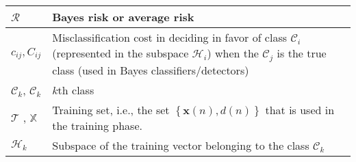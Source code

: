 \begin{xltabular}{\textwidth}{XX}
	\(\mathscr{R}\)                                                                                                                                                                & Bayes risk or average risk \cite{haykinNeuralNetworksLearning2009}                                                                                                                                                                                                                                                                     \\ \hline
	\(c_{ij}, C_{ij}\)                                                                                                                                                             & Misclassification cost in deciding in favor of class \(\mathscr{C}_i\) (represented in the subspace \(\mathscr{H}_i\)) when the \(\mathscr{C}_j\) is the true class (used in Bayes classifiers/detectors) \cite{haykinNeuralNetworksLearning2009,CharlesPES}                                                                           \\ \hline
	\(\mathscr{C}_k\)\cite{haykinNeuralNetworksLearning2009}, \(\mathcal{C}_k\) \cite{bishopPatternRecognitionMachine2006}                                                         & \(k\)th class                                                                                                                                                                                                                                                                                                                          \\ \hline
	\(\mathscr{T}\) \cite{haykinNeuralNetworksLearning2009}, \(\mathbb{X}\) \cite{goodfellowDeepLearning2016}                                                                      & Training set, i.e., the set \(\left\{ \mathbf{x}(n), d(n) \right\}\) that is used in the training phase.                                                                                                                                                                                                                               \\ \hline
	\(\mathscr{H}_k\)                                                                                                                                                              & Subspace of the training vector belonging to the class \(\mathscr{C}_k\)                                                                                                                                                                                                                                                               \\ \hline

\end{xltabular}
